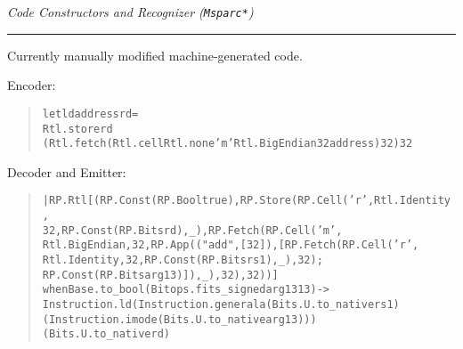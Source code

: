 \documentclass{seminar}
\def\heading#1{\textsf{\textit{#1}}\vskip2pt\hrule\bigskip}
\begin{document}

\begin{slide}
    \heading{Code Constructors and Recognizer (\texttt{Msparc*})}

    Currently manually modified machine-generated code.
    
    Encoder:
    
    \begin{quote}\small
    \begin{alltt}
let ld address rd = 
    Rtl.store rd 
        (Rtl.fetch (Rtl.cell Rtl.none 'm' Rtl.BigEndian 32 address) 32) 32
    \end{alltt}
    \end{quote}

    Decoder and Emitter:
    
    \begin{quote}\small
    \begin{alltt}
| RP.Rtl [(RP.Const (RP.Bool true), RP.Store (RP.Cell ('r', Rtl.Identity, 
    32, RP.Const (RP.Bits rd), _), RP.Fetch (RP.Cell ('m', 
      Rtl.BigEndian, 32, RP.App (("add", [32]), [RP.Fetch (RP.Cell ('r', 
          Rtl.Identity, 32, RP.Const (RP.Bits rs1), _), 32); 
          RP.Const (RP.Bits arg13)]), _), 32), 32))] 
when Base.to_bool (Bitops.fits_signed arg13 13) -> 
   Instruction.ld (Instruction.generala (Bits.U.to_native rs1) 
         (Instruction.imode (Bits.U.to_native arg13))) 
     (Bits.U.to_native rd) 
    \end{alltt}
    \end{quote}
\end{slide}

\end{document}
